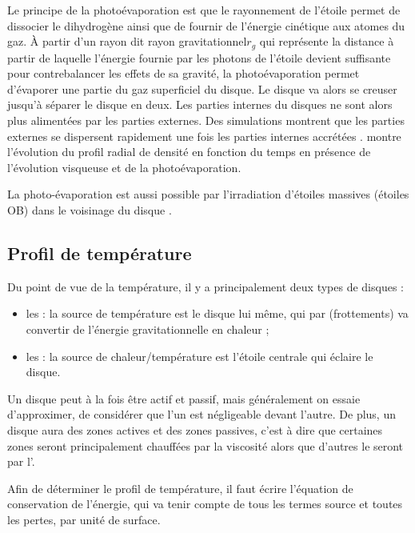Le principe de la photoévaporation est que le rayonnement de l'étoile permet de dissocier le dihydrogène ainsi que de fournir de l'énergie cinétique aux atomes du gaz. À partir d'un rayon dit \og rayon gravitationnel\fg $r_g$ qui représente la distance à partir de laquelle l'énergie fournie par les photons de l'étoile devient suffisante pour contrebalancer les effets de sa gravité, la photoévaporation permet d'évaporer une partie du gaz superficiel du disque. Le disque va alors se creuser jusqu'à séparer le disque en deux. Les parties internes du disques ne sont alors plus alimentées par les parties externes. Des simulations montrent que les parties externes se dispersent rapidement une fois les parties internes accrétées \citep{alexander2006photoevaporation}.  montre l'évolution du profil radial de densité en fonction du temps en présence de l'évolution visqueuse et de la photoévaporation.

La photo-évaporation est aussi possible par l'irradiation d'étoiles massives (étoiles OB) dans le voisinage du disque \citep{adams2004photoevaporation}.

\subsection{Profil de température}
Du point de vue de la température, il y a principalement deux types de disques : 
\begin{itemize}
\item les  : la source de température est le disque lui même, qui par  (frottements) va convertir de l'énergie gravitationnelle en chaleur ;
\item les  : la source de chaleur/température est l'étoile centrale qui éclaire le disque. 
\end{itemize}

Un disque peut à la fois être actif et passif, mais généralement on essaie d'approximer, de considérer que l'un est négligeable devant l'autre. De plus, un disque aura des zones actives et des zones passives, c'est à dire que certaines zones seront principalement chauffées par la viscosité alors que d'autres le seront par l'.

\bigskip

Afin de déterminer le profil de température, il faut écrire l'équation de conservation de l'énergie, qui va tenir compte de tous les termes source et toutes les pertes, par unité de surface.

